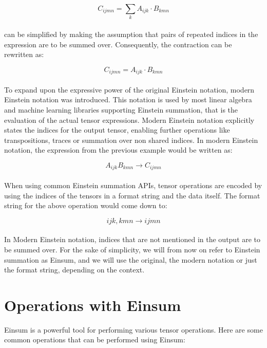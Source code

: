 \[C_{ijmn} = \sum_{k}A_{ijk} \cdot B_{kmn}\]
\noindent
\\
can be simplified by making the assumption that pairs of repeated indices in the expression
are to be summed over. Consequently, the contraction can be rewritten as:

\[C_{ijmn} = A_{ijk} \cdot B_{kmn}\]
\noindent
\\
To expand upon the expressive power of the original Einstein notation, modern Einstein
notation was introduced. This notation is used by most linear algebra and machine
learning libraries supporting Einstein summation, that is the evaluation of the actual
tensor expressions. Modern Einstein notation explicitly states the indices for the
output tensor, enabling further operations like transpositions, traces or summation
over non shared indices. In modern Einstein notation, the expression from the previous
example would be written as:

\[A_{ijk}B_{kmn} \rightarrow C_{ijmn}\]
\noindent
\\
When using common Einstein summation APIs, tensor operations are encoded by using the
indices of the tensors in a format string and the data itself.
\newpage
\noindent
The format string for the above operation would come down to:

\[ijk,kmn \rightarrow ijmn\]
\noindent
\\
In Modern Einstein notation, indices that are not mentioned in the output are to be
summed over. For the sake of simplicity, we will from now on refer to Einstein summation
as Einsum, and we will use the original, the modern notation or just the format
string, depending on the context.

\section{Operations with Einsum}
Einsum is a powerful tool for performing various tensor operations. Here are some
common operations that can be performed using Einsum:


